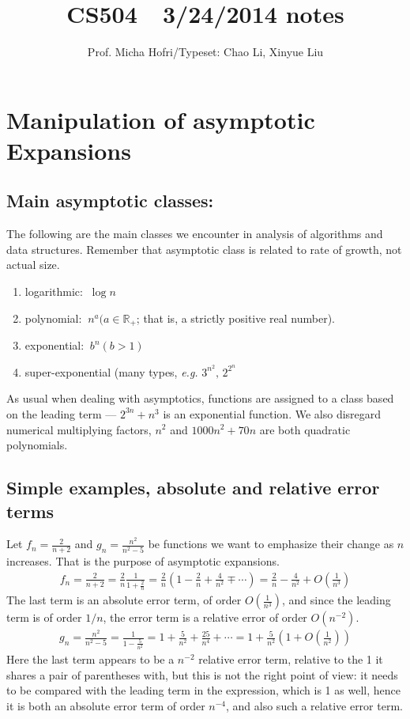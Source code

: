 \documentclass[11pt]{article}
\author{Prof. Micha Hofri/Typeset:  Chao Li, Xinyue Liu}
\title{CS504\ \  3/24/2014 notes}
\newcommand{\lp}{\left(}
\newcommand{\rp}{\right)}
\newcommand{\RR}{\mathbb{R}} \newcommand{\TT}{\mathbb{T}}
\begin{document}
\maketitle

\section{Manipulation of asymptotic Expansions}

\subsection{Main asymptotic classes:}
The following are the main classes we encounter in analysis of algorithms
and data structures.  Remember that asymptotic class is related to rate of
growth, not actual size.
\begin{enumerate}
\item logarithmic: $~\log n$
\item polynomial: $~n^a (a\in \RR_+$; that is, a strictly positive real
number).
\item exponential: $~b^n (b>1)$ 
\item super-exponential (many types, {\em e.g.} $3^{n^2},\, 2^{2^n}$
\end{enumerate}

As usual when dealing with asymptotics, functions are assigned to a class
based on the leading term --- $2^{3n} + n^3$ is an exponential function.
We also disregard numerical multiplying factors, $n^2$ and $1000n^2+70n$
are both quadratic polynomials.

\subsection{Simple examples, absolute and relative error terms}
Let  \(f_n=\frac{2}{n+2}\) and \(g_n=\frac{n^2}{n^2-5}\) be functions we want
to emphasize their change as $n$ increases.  That is the purpose of
asymptotic expansions.
\begin{align*}
f_n = \frac{2}{n+2} =\frac2n \frac1{1+\frac2n}
= \frac 2n \lp 1 - \frac2n + \frac 4{n^2} \mp \cdots \rp
= \frac2n -\frac4{n^2} +O\lp\frac{1}{n^3}\rp
\end{align*}
The last term is an absolute error term, of order $O\lp\frac{1}{n^3}\rp$,
and since the leading term is of order $1/n$, the error term is a relative
error of order $O\lp n^{-2}\rp$.
\begin{align*}
g_n=\frac{n^2}{n^2-5}=\frac1{1-\frac5{n^2}}
=1 +\frac5{n^2} +\frac{25}{n^4} +\cdots 
=1 +\frac5{n^2} \lp 1+O\lp\frac{1}{n^2}\rp\rp
\end{align*}
Here the last term appears to be a $n^{-2}$ relative error term, relative to
the 1 it shares a pair of parentheses with, but this is not the right
point of view: it needs to be compared with the leading term in the
expression, which is 1 as well, hence it is both an absolute error term
of order $n^{-4}$, and also such a relative error term.
\end{document}
